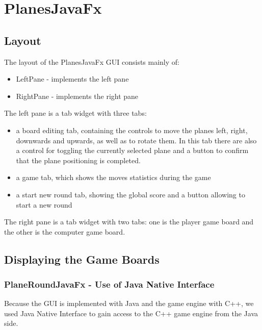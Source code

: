 \section {PlanesJavaFx}

\subsection{Layout}

The layout of the PlanesJavaFx GUI consists mainly of:

\begin{itemize}
	\item LeftPane - implements the left pane
	\item RightPane - implements the right pane
\end{itemize}

The left pane is a tab widget with three tabs:

\begin{itemize}
	\item a board editing tab, containing the controls to move the planes left, right, downwards and upwards, as well as to rotate them. In this tab there are also a control for toggling the currently selected plane and a button to confirm that the plane positioning is completed.
	\item a game tab, which shows the moves statistics during the game
	\item a start new round tab, showing the global score and a button allowing to start a new round
\end{itemize}

The right pane is a tab widget with two tabs: one is the player game board and the other is the computer game board.

\subsection{Displaying the Game Boards}

\subsubsection {PlaneRoundJavaFx - Use of Java Native Interface}

Because the GUI is implemented with Java and the game engine with C++, we used Java Native Interface to gain access to the C++ game engine from the Java side. 

